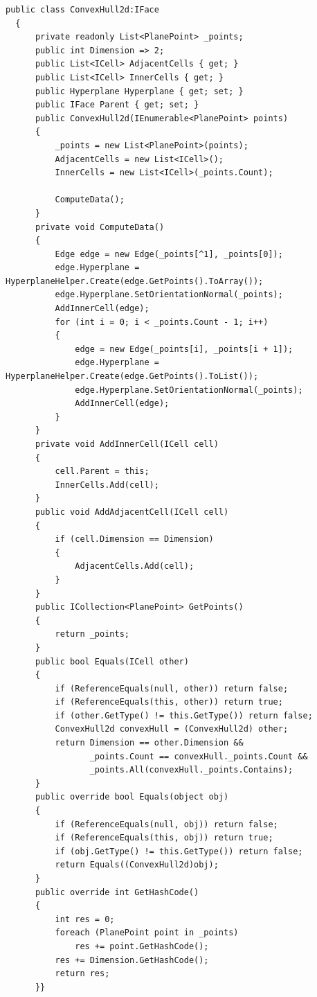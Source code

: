 \documentclass[14pt]{extarticle}
\begin{document}
\begin{lstlisting}[]
  public class ConvexHull2d:IFace
  {
      private readonly List<PlanePoint> _points;
      public int Dimension => 2;
      public List<ICell> AdjacentCells { get; }
      public List<ICell> InnerCells { get; }
      public Hyperplane Hyperplane { get; set; }
      public IFace Parent { get; set; }
      public ConvexHull2d(IEnumerable<PlanePoint> points)
      {
          _points = new List<PlanePoint>(points);
          AdjacentCells = new List<ICell>();
          InnerCells = new List<ICell>(_points.Count);

          ComputeData();
      }
      private void ComputeData()
      {
          Edge edge = new Edge(_points[^1], _points[0]);
          edge.Hyperplane = HyperplaneHelper.Create(edge.GetPoints().ToArray());
          edge.Hyperplane.SetOrientationNormal(_points);
          AddInnerCell(edge);
          for (int i = 0; i < _points.Count - 1; i++)
          {
              edge = new Edge(_points[i], _points[i + 1]);
              edge.Hyperplane = HyperplaneHelper.Create(edge.GetPoints().ToList());
              edge.Hyperplane.SetOrientationNormal(_points);
              AddInnerCell(edge);
          }
      }
      private void AddInnerCell(ICell cell)
      {
          cell.Parent = this;
          InnerCells.Add(cell);
      }
      public void AddAdjacentCell(ICell cell)
      {
          if (cell.Dimension == Dimension)
          {
              AdjacentCells.Add(cell);
          }
      }
      public ICollection<PlanePoint> GetPoints()
      {
          return _points;
      }
      public bool Equals(ICell other)
      {
          if (ReferenceEquals(null, other)) return false;
          if (ReferenceEquals(this, other)) return true;
          if (other.GetType() != this.GetType()) return false;
          ConvexHull2d convexHull = (ConvexHull2d) other;
          return Dimension == other.Dimension &&
                 _points.Count == convexHull._points.Count &&
                 _points.All(convexHull._points.Contains);
      }
      public override bool Equals(object obj)
      {
          if (ReferenceEquals(null, obj)) return false;
          if (ReferenceEquals(this, obj)) return true;
          if (obj.GetType() != this.GetType()) return false;
          return Equals((ConvexHull2d)obj);
      }
      public override int GetHashCode()
      {
          int res = 0;
          foreach (PlanePoint point in _points)
              res += point.GetHashCode();
          res += Dimension.GetHashCode();
          return res;
      }}
\end{lstlisting}
\newpage
\end{document}
